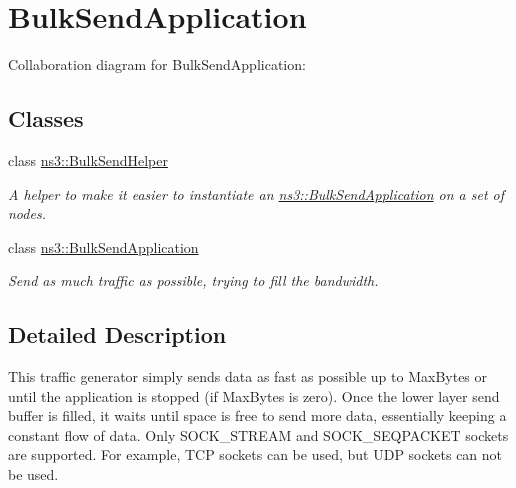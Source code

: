 \hypertarget{group__bulksend}{}\section{Bulk\+Send\+Application}
\label{group__bulksend}
Collaboration diagram for Bulk\+Send\+Application\+:
\subsection*{Classes}
\begin{DoxyCompactItemize}
\item 
class \hyperlink{classns3_1_1BulkSendHelper}{ns3\+::\+Bulk\+Send\+Helper}
\begin{DoxyCompactList}\small\item\em A helper to make it easier to instantiate an \hyperlink{classns3_1_1BulkSendApplication}{ns3\+::\+Bulk\+Send\+Application} on a set of nodes. \end{DoxyCompactList}\item 
class \hyperlink{classns3_1_1BulkSendApplication}{ns3\+::\+Bulk\+Send\+Application}
\begin{DoxyCompactList}\small\item\em Send as much traffic as possible, trying to fill the bandwidth. \end{DoxyCompactList}\end{DoxyCompactItemize}


\subsection{Detailed Description}
This traffic generator simply sends data as fast as possible up to Max\+Bytes or until the application is stopped (if Max\+Bytes is zero). Once the lower layer send buffer is filled, it waits until space is free to send more data, essentially keeping a constant flow of data. Only S\+O\+C\+K\+\_\+\+S\+T\+R\+E\+AM and S\+O\+C\+K\+\_\+\+S\+E\+Q\+P\+A\+C\+K\+ET sockets are supported. For example, T\+CP sockets can be used, but U\+DP sockets can not be used. 